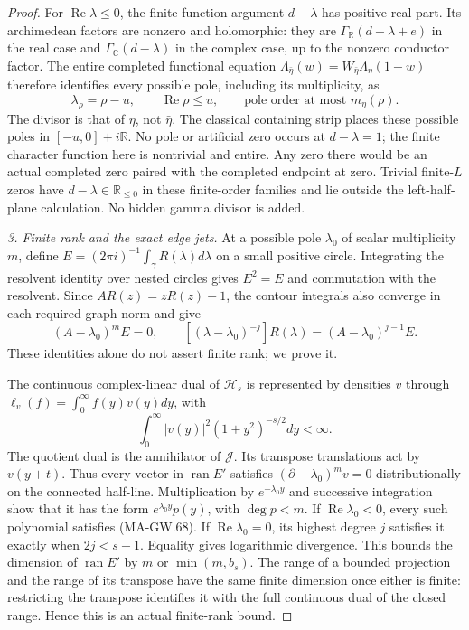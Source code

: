 \begin{proof}
For \(\operatorname{Re}\lambda\le0\), the finite-function
argument \(d-\lambda\) has positive real part.
Its archimedean factors are nonzero and holomorphic:
they are \(\Gamma_{\mathbb R}(d-\lambda+e)\) in the real
case and \(\Gamma_{\mathbb C}(d-\lambda)\) in the complex
case, up to the nonzero conductor factor.
The entire completed functional equation
\(\Lambda_{\bar\eta}(w)=W_{\bar\eta}\Lambda_\eta(1-w)\)
therefore identifies every possible pole, including its
multiplicity, as
\[
 \lambda_\rho=\rho-u,\qquad \operatorname{Re}\rho\le u,
 \qquad\text{pole order at most }m_\eta(\rho).
 \tag{MA-GW.66}
\]
The divisor is that of \(\eta\), not \(\bar\eta\).
The classical containing strip places these possible
poles in \([-u,0]+i\mathbb R\).
No pole or artificial zero occurs at \(d-\lambda=1\);
the finite character function here is nontrivial and
entire.  Any zero there would be an actual completed
zero paired with the completed endpoint at zero.
Trivial finite-\(L\) zeros have \(d-\lambda\in\mathbb R_{\le0}\) in these
finite-order families and lie outside the left-half-plane
calculation.  No hidden gamma divisor is added.

\emph{3. Finite rank and the exact edge jets.}
At a possible pole \(\lambda_0\) of scalar multiplicity \(m\),
define \(E=(2\pi i)^{-1}\int_\gamma R(\lambda)d\lambda\)
on a small positive circle.  Integrating the resolvent
identity over nested circles gives \(E^2=E\) and commutation
with the resolvent.  Since \(AR(z)=zR(z)-1\), the contour
integrals also converge in each required graph norm and give
\[
 (A-\lambda_0)^mE=0,\qquad
 [(\lambda-\lambda_0)^{-j}]R(\lambda)
                                =(A-\lambda_0)^{j-1}E .
 \tag{MA-GW.67}
\]
These identities alone do not assert finite rank; we prove it.

The continuous complex-linear dual of \(\mathcal H_s\)
is represented by densities \(v\) through
\(\ell_v(f)=\int_0^\infty f(y)v(y)dy\), with
\[
                \int_0^\infty|v(y)|^2(1+y^2)^{-s/2}dy<\infty .
 \tag{MA-GW.68}
\]
The quotient dual is the annihilator of \(\mathcal J\).
Its transpose translations act by \(v(y+t)\).
Thus every vector in \(\operatorname{ran}E'\) satisfies
\((\partial-\lambda_0)^mv=0\) distributionally on the
connected half-line.  Multiplication by \(e^{-\lambda_0y}\)
and successive integration show that it has the form
\(e^{\lambda_0y}p(y)\), with \(\deg p<m\).
If \(\operatorname{Re}\lambda_0<0\), every such polynomial
satisfies (MA-GW.68).  If \(\operatorname{Re}\lambda_0=0\),
its highest degree \(j\) satisfies it exactly when
\(2j<s-1\).  Equality gives logarithmic divergence.
This bounds the dimension of \(\operatorname{ran}E'\)
by \(m\) or \(\min(m,b_s)\).  The range of a bounded
projection and the range of its transpose have the same
finite dimension once either is finite: restricting the
transpose identifies it with the full continuous dual of
the closed range.  Hence this is an actual finite-rank bound.


\end{proof}
